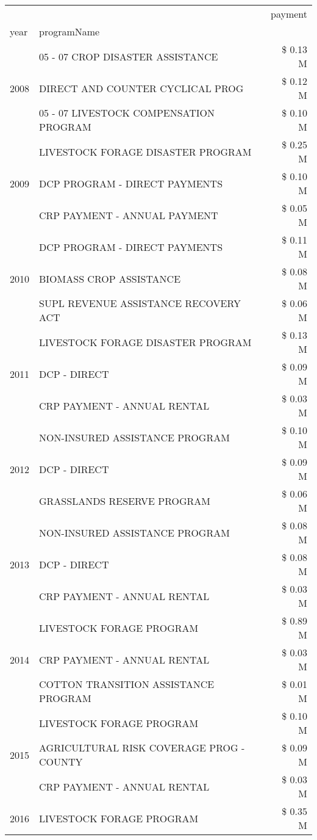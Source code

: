 \begin{tabular}{llr}
\toprule
 &  & payment \\
year & programName &  \\
\midrule
\multirow[t]{3}{*}{2008} & 05 - 07 CROP DISASTER ASSISTANCE & \$ 0.13 M \\
 & DIRECT AND COUNTER CYCLICAL PROG & \$ 0.12 M \\
 & 05 - 07 LIVESTOCK COMPENSATION PROGRAM & \$ 0.10 M \\
\cline{1-3}
\multirow[t]{3}{*}{2009} & LIVESTOCK FORAGE DISASTER  PROGRAM & \$ 0.25 M \\
 & DCP PROGRAM - DIRECT PAYMENTS & \$ 0.10 M \\
 & CRP PAYMENT - ANNUAL PAYMENT & \$ 0.05 M \\
\cline{1-3}
\multirow[t]{3}{*}{2010} & DCP PROGRAM - DIRECT PAYMENTS & \$ 0.11 M \\
 & BIOMASS CROP ASSISTANCE & \$ 0.08 M \\
 & SUPL REVENUE ASSISTANCE RECOVERY ACT & \$ 0.06 M \\
\cline{1-3}
\multirow[t]{3}{*}{2011} & LIVESTOCK FORAGE DISASTER PROGRAM & \$ 0.13 M \\
 & DCP - DIRECT & \$ 0.09 M \\
 & CRP PAYMENT - ANNUAL RENTAL & \$ 0.03 M \\
\cline{1-3}
\multirow[t]{3}{*}{2012} & NON-INSURED ASSISTANCE PROGRAM & \$ 0.10 M \\
 & DCP - DIRECT & \$ 0.09 M \\
 & GRASSLANDS RESERVE PROGRAM & \$ 0.06 M \\
\cline{1-3}
\multirow[t]{3}{*}{2013} & NON-INSURED ASSISTANCE PROGRAM & \$ 0.08 M \\
 & DCP - DIRECT & \$ 0.08 M \\
 & CRP PAYMENT - ANNUAL RENTAL & \$ 0.03 M \\
\cline{1-3}
\multirow[t]{3}{*}{2014} & LIVESTOCK FORAGE PROGRAM & \$ 0.89 M \\
 & CRP PAYMENT - ANNUAL RENTAL & \$ 0.03 M \\
 & COTTON TRANSITION ASSISTANCE PROGRAM & \$ 0.01 M \\
\cline{1-3}
\multirow[t]{3}{*}{2015} & LIVESTOCK FORAGE PROGRAM & \$ 0.10 M \\
 & AGRICULTURAL RISK COVERAGE PROG - COUNTY & \$ 0.09 M \\
 & CRP PAYMENT - ANNUAL RENTAL & \$ 0.03 M \\
\cline{1-3}
\multirow[t]{3}{*}{2016} & LIVESTOCK FORAGE PROGRAM                      & \$ 0.35 M \\

\end{tabular}
